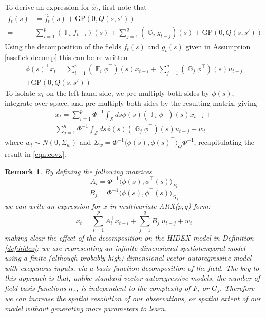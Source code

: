 \documentclass{IEEEtran}
\newcommand{\GP}[2]{\mathrm{GP}(#1,#2)}
\newcommand{\inner}[3]{\langle#1,#2\rangle_{#3}}
\DeclareMathOperator{\F}{\mathbb{F}}
\DeclareMathOperator{\G}{\mathbb{G}}
\newtheorem{remark}{Remark}
\begin{document}
To derive an expression for $\hat{x}_t$, first note that
\begin{equation}
	\begin{split}
	f_t(s) & = \hat{f}_t(s) + \GP{0}{Q(s,s')}\\
	 = & \sum_{i=1}^{p}( \F_i f_{t-i})(s) + \sum_{j=1}^{q}(\G_j g_{t-j})(s) + \GP{0}{Q(s,s')}
	\end{split}
\end{equation}
Using the decomposition of the fields $f_t(s)$ and $g_t(s)$ given in Assumption \ref{ass:fielddecomp} this can be re-written
\begin{equation}
	\begin{split}
	\phi(s)^\top x_t = \sum_{i=1}^{p}(\F_i \phi^\top)(s)x_{t-i} + \sum_{j=1}^{q}(\G_j\phi^\top)(s)u_{t-j} \\ 
	+ \GP{0}{Q(s,s')}
	\end{split}
\end{equation}
To isolate $x_t$ on the left hand side, we pre-multiply both sides by $\phi(s)$, integrate over space, and pre-multiply both sides by the resulting matrix, giving
\begin{equation}
	\begin{split}
	x_t = 
		\sum_{i=1}^{p} \Phi^{-1} \int_\mathcal{S}ds \phi(s)(\F_i \phi^\top)(s)x_{t-i} + \\
	\sum_{j=1}^{q} \Phi^{-1} \int_\mathcal{S}ds \phi(s)(\G_j\phi^\top)(s)u_{t-j} + w_t
	\end{split}
\end{equation}
where $w_t \sim N(0,\Sigma_w)$ and $\Sigma_w = \Phi^{-1} \inner{\phi(s)}{\phi(s)^\top}{Q} \Phi^{-1}$, recapitulating the result in \ref{eqn:covx}.
\begin{remark}
	By defining the following matrices
	\begin{equation}
		\label{eqn:arxA}
		A_i = \Phi^{-1} \inner{\phi(s)}{\phi^\top(s)}{F_i}
	\end{equation}
	\begin{equation}
		\label{eqn:arxB}
		B_j = \Phi^{-1} \inner{\phi(s)}{\phi^\top(s)}{G_j}
	\end{equation}
	we can write an expression for $x$ in multivariate ARX($p,q$) \cite{Ljung} form:
	\begin{equation}
		\label{eqn:arx}
		x_t = \sum_{i=1}^{p} A_i^\top x_{t-i} +  \sum_{j=1}^{q} B_j^\top u_{t-j} + w_t
	\end{equation}
	making clear the effect of the decomposition on the HIDEX model in Definition \ref{def:hidex}: we are representing an infinite dimensional spatiotemporal model using a finite (although probably high) dimensional vector autoregressive model with exogenous inputs, via a basis function decomposition of the field. The key to this approach is that, unlike standard vector autoregressive models, the number of field basis functions $n_x$, is independent to the complexity of $F_i$ or $G_j$. Therefore we can increase the spatial resolution of our observations, or spatial extent of our model without generating more parameters to learn.
\end{remark}
\end{document}
